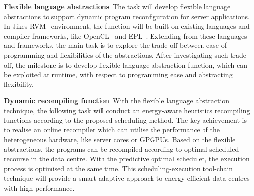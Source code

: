 \textbf{Flexible language abstractions}~The task will develop flexible language abstractions to support dynamic program reconfiguration for server applications. In Jikes RVM~\cite{JRVM} environment, the function will be built on existing languages and compiler frameworks, like OpenCL~\cite{opencl} and EPL~\cite{epl}. Extending from these languages and frameworks, the main task is to explore the trade-off between ease of programming and flexibilities of the abstractions. After investigating such trade-off, the milestone is to develop flexible language abstraction function, which can be exploited at runtime, with respect to programming ease and abstracting flexibility.

\textbf{Dynamic recompiling function}~With the flexible language abstraction technique, the following task will conduct an energy-aware heuristics recompiling functions according to the proposed scheduling method. The key achievement is to realise an online recompiler which can utilise the performance of the heterogeneous hardware, like server cores or GPGPUs. Based on the flexible abstractions, the programs can be recompiled according to optimal scheduled recourse in the data centre. With the predictive optimal scheduler, the execution process is optimised at the same time. This scheduling-execution tool-chain technique will provide a smart adaptive approach to energy-efficient data centres with high performance.
